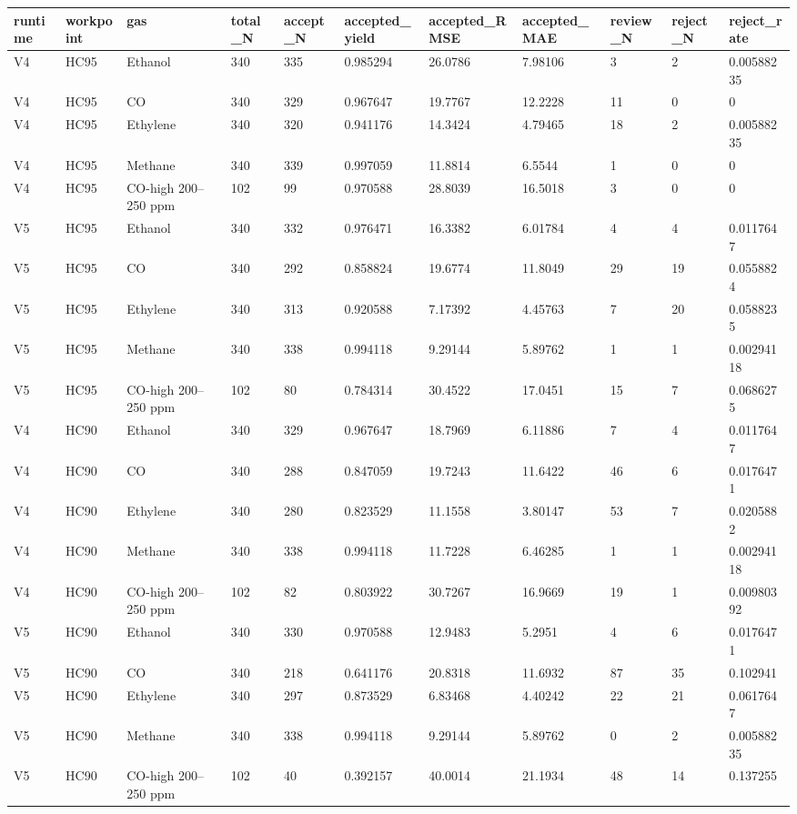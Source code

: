 \begin{tabular}{lllllllllll}
\toprule
runtime & workpoint & gas & total\_N & accept\_N & accepted\_yield & accepted\_RMSE & accepted\_MAE & review\_N & reject\_N & reject\_rate \\ \midrule
V4 & HC95 & Ethanol & 340 & 335 & 0.985294 & 26.0786 & 7.98106 & 3 & 2 & 0.00588235 \\
V4 & HC95 & CO & 340 & 329 & 0.967647 & 19.7767 & 12.2228 & 11 & 0 & 0 \\
V4 & HC95 & Ethylene & 340 & 320 & 0.941176 & 14.3424 & 4.79465 & 18 & 2 & 0.00588235 \\
V4 & HC95 & Methane & 340 & 339 & 0.997059 & 11.8814 & 6.5544 & 1 & 0 & 0 \\
V4 & HC95 & CO-high 200–250 ppm & 102 & 99 & 0.970588 & 28.8039 & 16.5018 & 3 & 0 & 0 \\
V5 & HC95 & Ethanol & 340 & 332 & 0.976471 & 16.3382 & 6.01784 & 4 & 4 & 0.0117647 \\
V5 & HC95 & CO & 340 & 292 & 0.858824 & 19.6774 & 11.8049 & 29 & 19 & 0.0558824 \\
V5 & HC95 & Ethylene & 340 & 313 & 0.920588 & 7.17392 & 4.45763 & 7 & 20 & 0.0588235 \\
V5 & HC95 & Methane & 340 & 338 & 0.994118 & 9.29144 & 5.89762 & 1 & 1 & 0.00294118 \\
V5 & HC95 & CO-high 200–250 ppm & 102 & 80 & 0.784314 & 30.4522 & 17.0451 & 15 & 7 & 0.0686275 \\
V4 & HC90 & Ethanol & 340 & 329 & 0.967647 & 18.7969 & 6.11886 & 7 & 4 & 0.0117647 \\
V4 & HC90 & CO & 340 & 288 & 0.847059 & 19.7243 & 11.6422 & 46 & 6 & 0.0176471 \\
V4 & HC90 & Ethylene & 340 & 280 & 0.823529 & 11.1558 & 3.80147 & 53 & 7 & 0.0205882 \\
V4 & HC90 & Methane & 340 & 338 & 0.994118 & 11.7228 & 6.46285 & 1 & 1 & 0.00294118 \\
V4 & HC90 & CO-high 200–250 ppm & 102 & 82 & 0.803922 & 30.7267 & 16.9669 & 19 & 1 & 0.00980392 \\
V5 & HC90 & Ethanol & 340 & 330 & 0.970588 & 12.9483 & 5.2951 & 4 & 6 & 0.0176471 \\
V5 & HC90 & CO & 340 & 218 & 0.641176 & 20.8318 & 11.6932 & 87 & 35 & 0.102941 \\
V5 & HC90 & Ethylene & 340 & 297 & 0.873529 & 6.83468 & 4.40242 & 22 & 21 & 0.0617647 \\
V5 & HC90 & Methane & 340 & 338 & 0.994118 & 9.29144 & 5.89762 & 0 & 2 & 0.00588235 \\
V5 & HC90 & CO-high 200–250 ppm & 102 & 40 & 0.392157 & 40.0014 & 21.1934 & 48 & 14 & 0.137255 \\
\bottomrule
\end{tabular}
